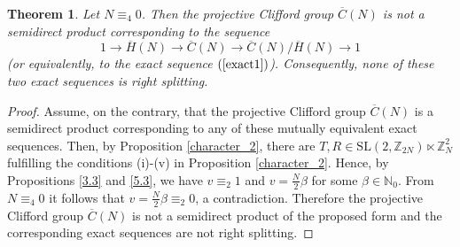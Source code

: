 \documentclass[10pt]{amsart}
\theoremstyle{plain}
\newtheorem{theorem}{Theorem}[section]
\theoremstyle{definition}
\theoremstyle{remark}%
\newcommand{\N}{\mathbb{N}}
\newcommand{\Z}{\mathbb{Z}}
\newcommand{\SL}{\mathrm{SL}}
\begin{document}
\begin{theorem}\label{6.1}
 Let $N\equiv_4 0$. Then the projective Clifford group $\overline{C}(N)$ is not a semidirect product corresponding to the sequence
 $$1 \to \overline{H}(N)\to \overline{C}(N)\to \overline{C}(N)/\overline{H}(N)\to 1
 $$   (or equivalently, to the exact sequence $(\ref{exact1})$). Consequently, none of these two exact sequences is right splitting.  
\end{theorem}
\begin{proof}
 Assume, on the contrary, that the projective Clifford group $\overline{C}(N)$ is a semidirect product corresponding to any of these mutually equivalent exact sequences. Then, by Proposition \ref{character_2}, there are $T,R\in \SL(2,\Z_{2N})\ltimes \Z_{N}^2$ fulfilling the conditions (i)-(v) in Proposition \ref{character_2}. Hence, by Propositions \ref{3.3} and \ref{5.3}, we have $v\equiv_2 1$ and $v=\frac{N}{2}\beta$ for some $\beta\in\N_0$. From $N\equiv_4 0$ it follows that $v=\frac{N}{2}\beta\equiv_2 0$, a contradiction. Therefore the projective Clifford group $\overline{C}(N)$ is not a semidirect product of the proposed form and the corresponding exact sequences are not right splitting.
\end{proof}
\end{document}
